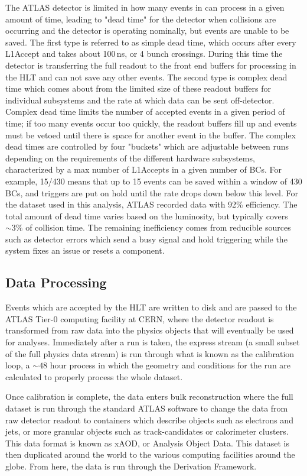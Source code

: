 The ATLAS detector is limited in how many events in can process in a given amount of time, leading to "dead time" for the detector when collisions are occurring and the detector is operating nominally, but events are unable to be saved.  The first type is referred to as simple dead time, which occurs after every L1Accept and takes about 100\,ns, or 4 bunch crossings.  During this time the detector is transferring the full readout to the front end buffers for processing in the HLT and can not save any other events.  The second type is complex dead time which comes about from the limited size of these readout buffers for individual subsystems and the rate at which data can be sent off-detector.  Complex dead time limits the number of accepted events in a given period of time; if too many events occur too quickly, the readout buffers fill up and events must be vetoed until there is space for another event in the buffer.  The complex dead times are controlled by four "buckets" which are adjustable between runs depending on the requirements of the different hardware subsystems, characterized by a max number of L1Accepts in a given number of BCs.  For example, 15/430 means that up to 15 events can be saved within a window of 430 BCs, and triggers are put on hold until the rate drops down below this level.
For the dataset used in this analysis, ATLAS recorded data with 92\% efficiency. The total amount of dead time varies based on the luminosity, but typically covers $\sim3\%$ of collision time.  The remaining inefficiency comes from reducible sources such as detector errors which send a busy signal and hold triggering while the system fixes an issue or resets a component.

\subsection{Data Processing}

Events which are accepted by the HLT are written to disk and are passed to the ATLAS Tier-0 computing facility at CERN, where the detector readout is transformed from raw data into the physics objects that will eventually be used for analyses.  Immediately after a run is taken, the express stream (a small subset of the full physics data stream) is run through what is known as the calibration loop, a $\sim48$ hour process in which the geometry and conditions for the run are calculated to properly process the whole dataset.

Once calibration is complete, the data enters bulk reconstruction where the full dataset is run through the standard ATLAS software to change the data from raw detector readout to containers which describe objects such as electrons and jets, or more granular objects such as track-candidates or calorimeter clusters.  This data format is known as xAOD, or Analysis Object Data.  This dataset is then duplicated around the world to the various computing facilities around the globe.  From here, the data is run through the Derivation Framework.

